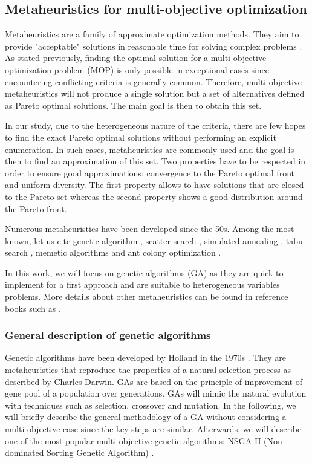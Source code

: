 \subsection{Metaheuristics for multi-objective optimization}
\label{subsec:metaheuristics}
Metaheuristics are a family of approximate optimization methods. They aim to provide "acceptable" solutions in reasonable time for solving complex problems \cite{talbi09}. As stated previously, finding the optimal solution for a multi-objective optimization problem (MOP) is only possible in exceptional cases since encountering conflicting criteria is generally common. Therefore, multi-objective metaheuristics will not produce a single solution but a set of alternatives defined as Pareto optimal solutions. The main goal is then to obtain this set.

In our study, due to the heterogeneous nature of the criteria, there are few hopes to find the exact Pareto optimal solutions without performing an explicit enumeration. In such cases, metaheuristics are commonly used and the goal is then to find an approximation of this set. Two properties have to be respected in order to ensure good approximations: convergence to the Pareto optimal front and uniform diversity. The first property allows to have solutions that are closed to the Pareto set whereas the second property shows a good distribution around the Pareto front.

Numerous metaheuristics have been developed since the 50s. Among the most known, let us cite genetic algorithm \cite{holland1975adaptation}, scatter search \cite{Glover77}, simulated annealing \cite{KirkpatrickGelattVecchi83}, tabu search \cite{Glover86}, memetic algorithms \cite{moscato89on} and ant colony optimization \cite{Dor92a.phd}.

In this work, we will focus on genetic algorithms (GA) as they are quick to implement for a first approach and are suitable to heterogeneous variables problems. More details about other metaheuristics can be found in reference books such as \cite{talbi09,dreo06metaheuristics,8125462}.

\subsubsection{General description of genetic algorithms}
Genetic algorithms have been developed by Holland in the 1970s \cite{holland1975adaptation}. They are metaheuristics that reproduce the properties of a natural selection process as described by Charles Darwin. GAs are based on the principle of improvement of gene pool of a population over generations. GAs will mimic the natural evolution with techniques such as selection, crossover and mutation. In the following, we will briefly describe the general methodology of a GA without considering a multi-objective case since the key steps are similar. Afterwards, we will describe one of the most popular multi-objective genetic algorithms: NSGA-II (Non-dominated Sorting Genetic Algorithm) \cite{Deb00afast}.


